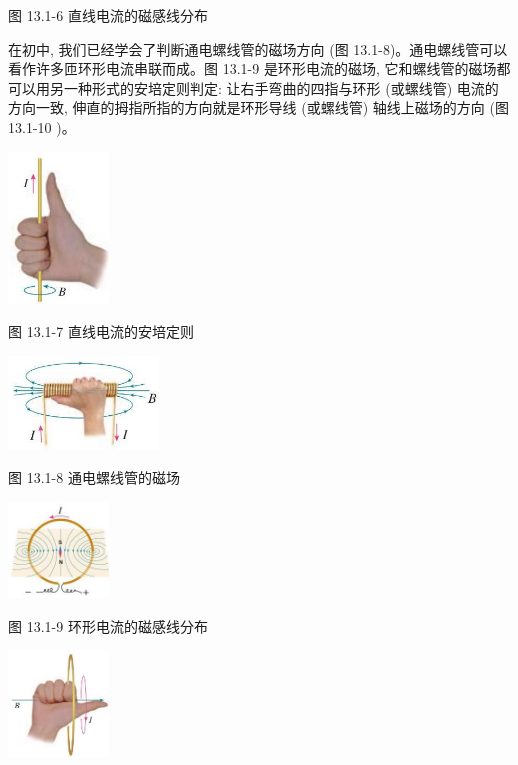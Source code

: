 \documentclass[10pt]{article}
\begin{document}
图 13.1-6 直线电流的磁感线分布

在初中, 我们已经学会了判断通电螺线管的磁场方向 (图 13.1-8)。通电螺线管可以看作许多匝环形电流串联而成。图 13.1-9 是环形电流的磁场, 它和螺线管的磁场都可以用另一种形式的安培定则判定: 让右手弯曲的四指与环形 (或螺线管) 电流的方向一致, 伸直的拇指所指的方向就是环形导线 (或螺线管) 轴线上磁场的方向 (图 13.1-10 )。

\begin{center}
\includegraphics[max width=0.2\textwidth]{images/01911d5f-8e38-70c0-b5b8-2b399bd115b6_112_948495.jpg}
\end{center}

图 13.1-7 直线电流的安培定则

\begin{center}
\includegraphics[max width=0.3\textwidth]{images/01911d5f-8e38-70c0-b5b8-2b399bd115b6_112_744394.jpg}
\end{center}

图 13.1-8 通电螺线管的磁场

\begin{center}
\includegraphics[max width=0.2\textwidth]{images/01911d5f-8e38-70c0-b5b8-2b399bd115b6_112_996242.jpg}
\end{center}

图 13.1-9 环形电流的磁感线分布

\begin{center}
\includegraphics[max width=0.2\textwidth]{images/01911d5f-8e38-70c0-b5b8-2b399bd115b6_112_334955.jpg}
\end{center}
\end{document}
